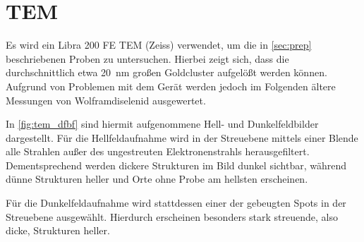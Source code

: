 \newpage
\section{TEM} %

 Es wird ein Libra 200 FE TEM (Zeiss) verwendet, um die in \cref{sec:prep} beschriebenen Proben zu untersuchen.
 Hierbei zeigt sich, dass die durchschnittlich etwa \SI{20}{nm} großen Goldcluster aufgelößt werden können.
 Aufgrund von Problemen mit dem Gerät werden jedoch im Folgenden ältere Messungen von Wolframdiselenid ausgewertet.

 In \cref{fig:tem_dfbf} sind hiermit aufgenommene Hell- und Dunkelfeldbilder dargestellt. %
 Für die Hellfeldaufnahme wird in der Streuebene mittels einer Blende alle Strahlen außer des ungestreuten Elektronenstrahls herausgefiltert.
 Dementsprechend werden dickere Strukturen im Bild dunkel sichtbar, während dünne Strukturen heller und Orte ohne Probe am hellsten erscheinen.

 Für die Dunkelfeldaufnahme wird stattdessen einer der gebeugten Spots in der Streuebene ausgewählt.
 Hierdurch erscheinen besonders stark streuende, also dicke, Strukturen heller.


